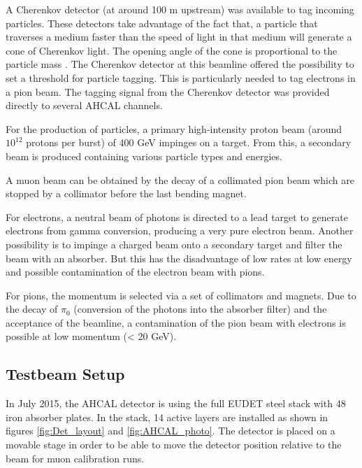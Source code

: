 A Cherenkov detector (at around 100 m upstream) was available to tag incoming particles. These detectors take advantage of the fact that, a particle that traverses a medium faster than the speed of light in that medium will generate a cone of Cherenkov light. The opening angle of the cone is proportional to the particle mass \cite{GOVORKOV20059}. The Cherenkov detector at this beamline offered the possibility to set a threshold for particle tagging. This is particularly needed to tag electrons in a pion beam. The tagging signal from the Cherenkov detector was provided directly to several AHCAL channels.

For the production of particles, a primary high-intensity proton beam (around $10^{12}$ protons per burst) of 400 GeV impinges on a target. From this, a secondary beam is produced containing various particle types and energies.

A muon beam can be obtained by the decay of a collimated pion beam which are stopped by a collimator before the last bending magnet.

For electrons, a neutral beam of photons is directed to a lead target to generate electrons from gamma conversion, producing a very pure electron beam. Another possibility is to impinge a charged beam onto a secondary target and filter the beam with an absorber. But this has the disadvantage of low rates at low energy and possible contamination of the electron beam with pions.

For pions, the momentum is selected via a set of collimators and magnets. Due to the decay of $\pi_0$ (conversion of the photons into the absorber filter) and the acceptance of the beamline, a contamination of the pion beam with electrons is possible at low momentum (< 20 GeV).

\subsection{Testbeam Setup}
\label{sec:TBsetup}

In July 2015, the AHCAL detector is using the full EUDET steel stack \cite{EUDET-Report-2010-02} with 48 iron absorber plates. In the stack, 14 active layers are installed as shown in figures \ref{fig:Det_layout} and \ref{fig:AHCAL_photo}. The detector is placed on a movable stage in order to be able to move the detector position relative to the beam for muon calibration runs.

